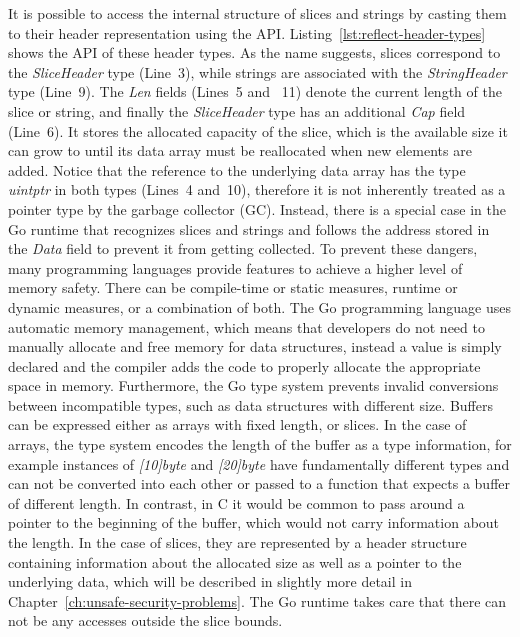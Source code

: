 It is possible to access the internal structure of slices and strings by casting them to their header representation
using the \unsafe{} \acrshort{API}.
Listing~\ref{lst:reflect-header-types} shows the \acrshort{API} of these header types.
As the name suggests, slices correspond to the \textit{SliceHeader} type (Line~3), while strings are associated with the
\textit{StringHeader} type (Line~9).
The \textit{Len} fields (Lines~5 and ~11) denote the current length of the slice or string, and finally the
\textit{SliceHeader} type has an additional \textit{Cap} field (Line~6).
It stores the allocated capacity of the slice, which is the available size it can grow to until its data array must be
reallocated when new elements are added.
Notice that the reference to the underlying data array has the type \textit{uintptr} in both types (Lines~4 and~10),
therefore it is not inherently treated as a pointer type by the garbage collector (\acrshort{GC}).
Instead, there is a special case in the Go runtime that recognizes slices and strings and follows the address stored in
the \textit{Data} field to prevent it from getting collected.
To prevent these dangers, many programming languages provide features to achieve a higher level of memory safety.
There can be compile-time or static measures, runtime or dynamic measures, or a combination of both.
The Go programming language uses automatic memory management, which means that developers do not need to manually
allocate and free memory for data structures, instead a value is simply declared and the compiler adds the code to
properly allocate the appropriate space in memory.
Furthermore, the Go type system prevents invalid conversions between incompatible types, such as data structures with
different size.
Buffers can be expressed either as arrays with fixed length, or slices.
In the case of arrays, the type system encodes the length of the buffer as a type information, for example instances
of \textit{[10]byte} and \textit{[20]byte} have fundamentally different types and can not be converted into each other
or passed to a function that expects a buffer of different length.
In contrast, in C it would be common to pass around a pointer to the beginning of the buffer, which would not carry
information about the length.
In the case of slices, they are represented by a header structure containing information about the allocated size as
well as a pointer to the underlying data, which will be described in slightly more detail in
Chapter~\ref{ch:unsafe-security-problems}.
The Go runtime takes care that there can not be any accesses outside the slice bounds.


